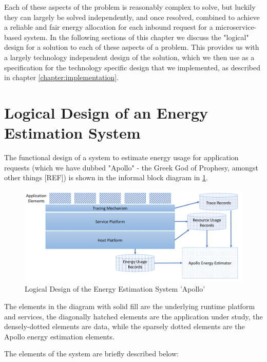 Each of these aspects of the problem is reasonably complex to solve, but luckily they can largely be solved independently, and once resolved, combined to achieve a reliable and fair energy allocation for each inbound request for a microservice-based system.  In the following sections of this chapter we discuss the "logical" design for a solution to each of these aspects of a problem.  This provides us with a largely technology independent design of the solution, which we then use as a specification for the technology specific design that we implemented, as described in chapter \ref{chapter:implementation}.

\section{Logical Design of an Energy Estimation System}

The functional design of a system to estimate energy usage for application requests (which we have dubbed "Apollo" - the Greek God of Prophesy, amongst other things [REF]) is shown in the informal block diagram in \ref{figure:logicaldesign}.

\begin{figure}
\centering
\includegraphics[width=\textwidth]{Figures/estimating-energy-logical}
\caption{Logical Design of the Energy Estimation System 'Apollo'}
\label{figure:logicaldesign}
\end{figure}

The elements in the diagram with solid fill are the underlying runtime platform and services, the diagonally hatched elements are the application under study, the densely-dotted elements are data, while the sparsely dotted elements are the Apollo energy estimation elements.

The elements of the system are briefly described below:

